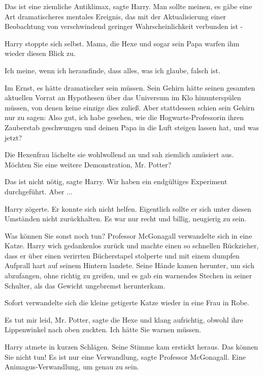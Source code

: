 \glqq{}Das ist eine ziemliche Antiklimax\grqq{}, sagte Harry. \glqq{}Man sollte
meinen, es gäbe eine Art dramatischeres mentales Ereignis, das mit der
Aktualisierung einer Beobachtung von verschwindend geringer Wahrscheinlichkeit
verbunden ist -\grqq{}

Harry stoppte sich selbst. Mama, die Hexe und sogar sein Papa warfen ihm wieder
diesen Blick zu.

\glqq{}Ich meine, wenn ich herausfinde, dass alles, was ich glaube, falsch
ist.\grqq{}

Im Ernst, es hätte dramatischer sein müssen. Sein Gehirn hätte seinen gesamten
aktuellen Vorrat an Hypothesen über das Universum im Klo hinunterspülen müssen,
von denen keine einzige dies zuließ. Aber stattdessen schien sein Gehirn nur zu
sagen: \glqq{}Also gut, ich habe gesehen, wie die Hogwarts-Professorin ihren
Zauberstab geschwungen und deinen Papa in die Luft steigen lassen hat, und was
jetzt?\grqq{}

Die Hexenfrau lächelte sie wohlwollend an und sah ziemlich amüsiert aus. \glqq{}
Möchten Sie eine weitere Demonstration, Mr. Potter?\grqq{}

\glqq{}Das ist nicht nötig\grqq{}, sagte Harry. \glqq{}Wir haben ein endgültiges
Experiment durchgeführt. Aber ...\grqq{}

Harry zögerte. Er konnte sich nicht helfen. Eigentlich sollte er sich unter
diesen Umständen nicht zurückhalten. Es war nur recht und billig, neugierig zu
sein.

\glqq{}Was können Sie sonst noch tun?\grqq{} Professor McGonagall verwandelte
sich in eine Katze. Harry wich gedankenlos zurück und machte einen so schnellen
Rückzieher, dass er über einen verirrten Bücherstapel stolperte und mit einem
dumpfen Aufprall hart auf seinem Hintern landete. Seine Hände kamen herunter, um
sich abzufangen, ohne richtig zu greifen, und es gab ein warnendes Stechen in
seiner Schulter, als das Gewicht ungebremst herunterkam.

Sofort verwandelte sich die kleine getigerte Katze wieder in eine Frau in Robe.

\glqq{}Es tut mir leid, Mr. Potter\grqq{}, sagte die Hexe und klang aufrichtig,
obwohl ihre Lippenwinkel nach oben zuckten. \glqq{}Ich hätte Sie warnen
müssen.\grqq{}

Harry atmete in kurzen Schlägen. Seine Stimme kam erstickt heraus. \glqq{}Das
können Sie nicht tun!\grqq{} \glqq{}Es ist nur eine Verwandlung\grqq{}, sagte
Professor McGonagall. \glqq{}Eine Animagus-Verwandlung, um genau zu sein.\grqq{}

